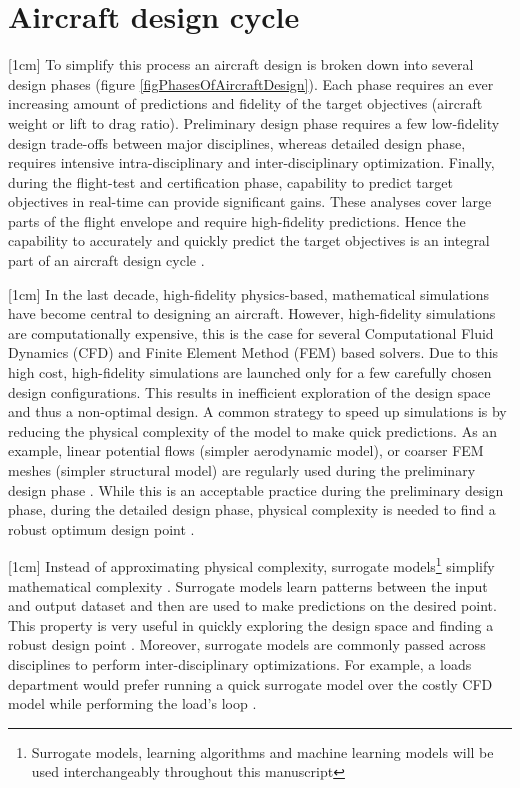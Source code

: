 \section{Aircraft design cycle}\label{secSircraftDesignCycle}
[1cm]
To simplify this process an aircraft design is broken down into several design phases (figure \ref{figPhasesOfAircraftDesign}). Each phase requires an ever increasing amount of predictions and fidelity of the target objectives (aircraft weight or lift to drag ratio). Preliminary design phase requires a few low-fidelity design trade-offs between major disciplines, whereas detailed design phase, requires intensive intra-disciplinary and inter-disciplinary optimization. Finally, during the flight-test and certification phase, capability to predict target objectives in real-time can provide significant gains. These analyses cover large parts of the flight envelope and require high-fidelity predictions. Hence the capability to accurately and quickly predict the target objectives is an integral part of an aircraft design cycle \cite{raymer2012aircraft}. 

[1cm]
In the last decade, high-fidelity physics-based, mathematical simulations have become central to designing an aircraft. However, high-fidelity simulations are computationally expensive, this is the case for several Computational Fluid Dynamics (CFD) and Finite Element Method (FEM) based solvers. Due to this high cost, high-fidelity simulations are launched only for a few carefully chosen design configurations. This results in inefficient exploration of the design space and thus a non-optimal design. A common strategy to speed up simulations is by reducing the physical complexity of the model to make quick predictions. As an example, linear potential flows (simpler aerodynamic model), or coarser FEM meshes (simpler structural model) are regularly used during the preliminary design phase \cite{cummings2015applied}. While this is an acceptable practice during the preliminary design phase, during the detailed design phase, physical complexity is needed to find a robust optimum design point \cite{raymer2012aircraft}.

[1cm]
Instead of approximating physical complexity, surrogate models\footnote{Surrogate models, learning algorithms and machine learning models will be used interchangeably throughout this manuscript} simplify mathematical complexity \cite{verveld2016reduced}. Surrogate models learn patterns between the input and output dataset and then are used to make predictions on the desired point. This property is very useful in quickly exploring the design space and finding a robust design point \cite{forrester2008engineering}. Moreover, surrogate models are commonly passed across disciplines to perform inter-disciplinary optimizations. For example, a loads department would prefer running a quick surrogate model over the costly CFD model while performing the load's loop \cite{bartoliAIAA2017, bartoliAGILE2017}.  


